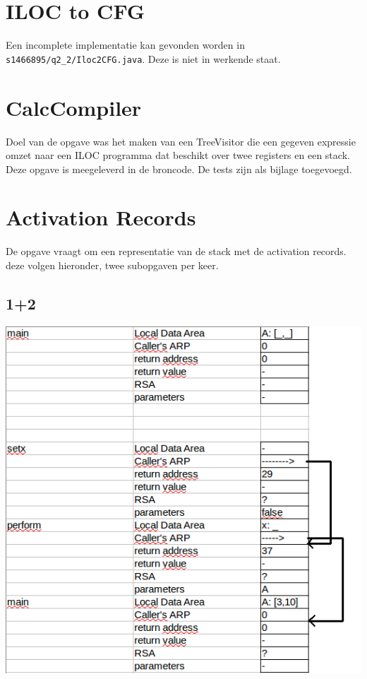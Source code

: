 \documentclass[10pt,a4paper,titlepage]{report}
\begin{document}
\chapter{ILOC to CFG}
Een incomplete implementatie kan gevonden worden in \verb|s1466895/q2_2/Iloc2CFG.java|. Deze is niet in werkende staat.

\chapter{CalcCompiler}
Doel van de opgave was het maken van een TreeVisitor die een gegeven expressie omzet naar een ILOC programma dat beschikt over twee registers en een stack. Deze opgave is meegeleverd in de broncode. De tests zijn als bijlage toegevoegd.

\chapter{Activation Records}
De opgave vraagt om een representatie van de stack met de activation records. deze volgen hieronder, twee subopgaven per keer.
\section{1+2}
\includegraphics[width=\textwidth]{q2_4/1+2.png}
\end{document}
